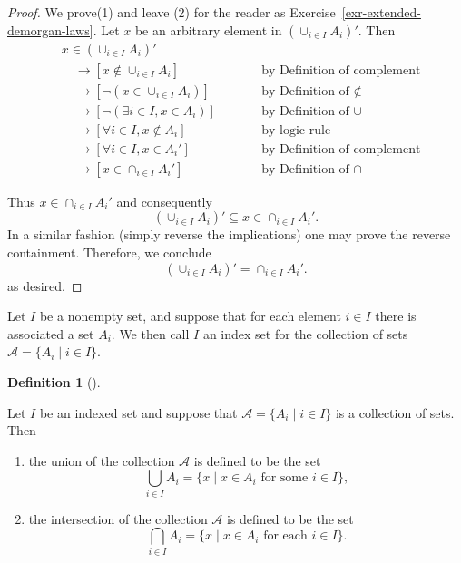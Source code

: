 \documentclass[
  letterpaper,
  10pt,
  reqno,
  twopage,
  openany]{book}
\providecommand{\tightlist}{%
  \setlength{\itemsep}{0pt}\setlength{\parskip}{0pt}}\usepackage{longtable,booktabs,array}
\theoremstyle{plain}
\theoremstyle{definition}
\theoremstyle{definition}
\newtheorem{definition}{Definition}[chapter]
\theoremstyle{definition}
\theoremstyle{plain}
\theoremstyle{plain}
\theoremstyle{remark}
\begin{document}
\begin{proof}

We prove(1) and leave (2) for the reader as
Exercise~\ref{exr-extended-demorgan-laws}. Let \(x\) be an arbitrary
element in \(\left(\cup_{i\in I} A_i\right)'.\) Then \begin{align*}
& x\in \left(\cup_{i\in I} A_i\right)' & \qquad & \\
& \quad \rightarrow [x\notin \cup_{i\in I} A_i] & &  \text{by Definition of complement} \\
& \quad \rightarrow [\neg(x\in \cup_{i\in I} A_i)] & &  \text{by Definition of $\notin$} \\
& \quad \rightarrow [\neg(\exists i\in I, x\in A_i)] & &  \text{by Definition of $\cup$} \\
& \quad \rightarrow [\forall i\in I, x\notin A_i] & &  \text{by logic rule} \\
& \quad \rightarrow [\forall i\in I, x\in A_i'] & &  \text{by Definition of complement} \\
& \quad \rightarrow [x\in \cap_{i\in I} A_i'] & &  \text{by Definition of $\cap$}
\end{align*}

Thus \(x\in \cap_{i\in I} A_i'\) and consequently \[
\left(\cup_{i\in I} A_i\right)' \subseteq x\in \cap_{i\in I} A_i'.
\] In a similar fashion (simply reverse the implications) one may prove
the reverse containment. Therefore, we conclude \[
\left(\cup_{i\in I} A_i\right)' = \cap_{i\in I} A_i'.
\] as desired.

\end{proof}

Let \(I\) be a nonempty set, and suppose that for each element
\(i\in I\) there is associated a set \(A_i\). We then call \(I\) an
index set for the collection of sets
\(\mathcal{A}=\{A_i \mid i\in I\}\).

\leavevmode{}%
\begin{definition}[]\label{def-union-intersection-collection}

Let \(I\) be an indexed set and suppose that
\(\mathcal{A}=\{A_i\mid i\in I\}\) is a collection of sets. Then

\begin{enumerate}
\def\labelenumi{\arabic{enumi}.}
\tightlist
\item
  the union of the collection \(\mathcal{A}\) is defined to be the set
  \[
  \bigcup_{i\in I} A_i =\{x\mid x\in A_i \text{ for some } i\in I\}, 
  \]
\item
  the intersection of the collection \(\mathcal{A}\) is defined to be
  the set \[
  \bigcap_{i\in I} A_i  =\{x\mid x\in A_i \text{ for each } i\in I\}.
  \]
\end{enumerate}

\end{definition}
\end{document}
